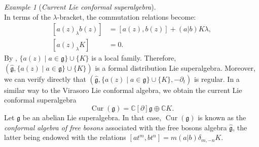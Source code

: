 \documentclass[a4paper, 12pt, reqno]{amsart}
\theoremstyle{remark}
\newtheorem{example}[theorem]{Example}
\numberwithin{equation}{subsection}
\DeclareMathOperator{\Cur}{Cur}
\begin{document}
\begin{example}[\emph{Current Lie conformal superalgebra}]
\begin{equation*}
  \end{equation*}
  In terms of the $\lambda$-bracket, the commutation relations become:
  \begin{equation*}
    \begin{split}
      [a(z)_{\lambda}b(z)] &= [a(z), b(z)] + (a| b)K\lambda, \\
      [a(z)_{\lambda}K] &= 0.
    \end{split}
  \end{equation*}
  By , $\{a(z) \mid a \in \mathfrak{g}\} \cup \{K\}$ is a local family.
  Therefore, $(\hat{\mathfrak{g}}, \{a(z) \mid a \in \mathfrak{g}\} \cup \{K\})$ is a formal distribution Lie superalgebra.
  Moreover, we can verify directly that $(\hat{\mathfrak{g}}, \{a(z) \mid a \in \mathfrak{g}\} \cup \{K\}, -\partial_t)$ is regular.
  In a similar way to the Virasoro Lie conformal algebra, we obtain the current Lie conformal superalgebra
  \begin{equation*}
    \Cur(\mathfrak{g}) = \mathbb{C}[\partial]\mathfrak{g} \oplus \mathbb{C}K.
  \end{equation*}
  Let $\mathfrak{g}$ be an abelian Lie superalgebra.
  In that case, $\Cur(\mathfrak{g})$ is known as the \emph{conformal algebra of free bosons} associated with the free bosons algebra $\hat{\mathfrak{g}}$, the latter being endowed with the relations $[at^m, bt^n] = m(a| b)\delta_{m, -n}K$.
\end{example}
\end{document}
